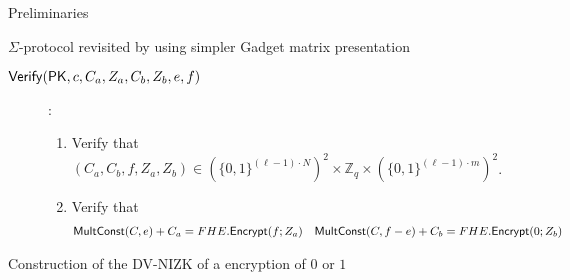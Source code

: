 \begin{section}{Preliminaries}
\begin{subsection}{$\Sigma$-protocol revisited by using simpler Gadget matrix presentation}
\begin{description}
    \item[${\mathsf{Verify}}(\mathsf{PK}, c, C_a, Z_a, C_b, Z_b, e, f)$]:
      \begin{enumerate}
      \item Verify that $(C_a, C_b, f, Z_a, Z_b) \in (\{0,1\}^{(\ell-1) \cdot N})^2 \times \mathbb{Z}_q \times (\{0,1\}^{(\ell-1)\cdot m})^2$.
      \item Verify that
        \begin{align*}
          {\mathsf{MultConst}}(C, e)+C_a &= FHE.{\mathsf{Encrypt}}(f; Z_a) & {\mathsf{MultConst}}(C, f-e) + C_b &= FHE.{\mathsf{Encrypt}}(0; Z_b)
        \end{align*}
      \end{enumerate}
    \end{description}
  \end{subsection}


  
  \begin{subsection}{Construction of the DV-NIZK of a encryption of $0$ or $1$}
    \begin{description}


\end{description}
\end{subsection}
\end{section}

